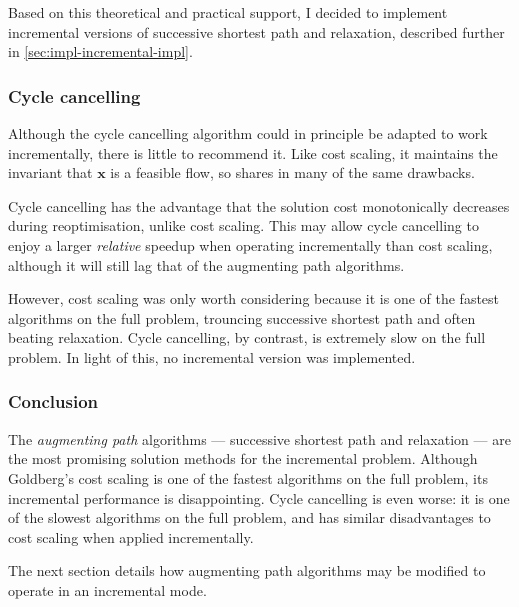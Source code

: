 Based on this theoretical and practical support, I decided to implement incremental versions of successive shortest path and relaxation, described further in \cref{sec:impl-incremental-impl}.

\subsubsection{Cycle cancelling}

Although the cycle cancelling algorithm could in principle be adapted to work incrementally, there is little to recommend it. Like cost scaling, it maintains the invariant that $\mathbf{x}$ is a feasible flow, so shares in many of the same drawbacks.  

Cycle cancelling has the advantage that the solution cost monotonically decreases during reoptimisation, unlike cost scaling\footnotemark. This may allow cycle cancelling to enjoy a larger \emph{relative} speedup when operating incrementally than cost scaling, although it will still lag that of the augmenting path algorithms.

However, cost scaling was only worth considering because it is one of the fastest algorithms on the full problem, trouncing successive shortest path and often beating relaxation. Cycle cancelling, by contrast, is extremely slow on the full problem. In light of this, no incremental version was implemented.

\subsubsection{Conclusion}

The \emph{augmenting path} algorithms --- successive shortest path and relaxation --- are the most promising solution methods for the incremental problem. Although Goldberg's cost scaling is one of the fastest algorithms on the full problem, its incremental performance is disappointing. Cycle cancelling is even worse: it is one of the slowest algorithms on the full problem, and has similar disadvantages to cost scaling when applied incrementally.

The next section details how augmenting path algorithms may be modified to operate in an incremental mode.

